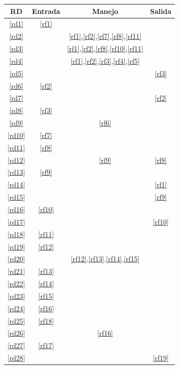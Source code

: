 \documentclass[12pt,a4paper]{article}
\begin{document}
\begin{table}[H]
\begin{center}
\begin{tabular}{|c|c|c|c|}
\hline
	RD & Entrada & Manejo & Salida\\
\hline
	\ref{rd1} & \ref{rf1} &  & \\
\hline
	\ref{rd2} &  & \ref{rf1},\ref{rf2},\ref{rf7},\ref{rf8},\ref{rf11} & \\
\hline
	\ref{rd3} &  & \ref{rf1},\ref{rf2},\ref{rf8},\ref{rf10},\ref{rf11} & \\
\hline
	\ref{rd4} &  & \ref{rf1},\ref{rf2},\ref{rf3},\ref{rf4},\ref{rf5} & \\
\hline
	\ref{rd5} &  &  & \ref{rf3} \\
\hline
	\ref{rd6} & \ref{rf2} &  & \\
\hline
	\ref{rd7} &  &  & \ref{rf2}\\
\hline
	\ref{rd8} & \ref{rf3} &  & \\
\hline
	\ref{rd9} &  & \ref{rf6} & \\
\hline
	\ref{rd10} & \ref{rf7} &  & \\
\hline
	\ref{rd11} & \ref{rf8} &  & \\
\hline
	\ref{rd12} &  & \ref{rf9} & \ref{rf8}\\
\hline
	\ref{rd13} & \ref{rf9} &  & \\
\hline
	\ref{rd14} &  &  & \ref{rf1}\\
\hline
	\ref{rd15} &  &  & \ref{rf9}\\
\hline
	\ref{rd16} & \ref{rf10} &  & \\
\hline
	\ref{rd17} &  &  & \ref{rf10} \\
\hline
	\ref{rd18} & \ref{rf11} &  & \\
\hline
	\ref{rd19} & \ref{rf12} &  & \\
\hline
	\ref{rd20} &  & \ref{rf12},\ref{rf13},\ref{rf14},\ref{rf15} & \\
\hline
	\ref{rd21} & \ref{rf13} &  & \\
\hline
	\ref{rd22} & \ref{rf14} &  & \\
\hline
	\ref{rd23} & \ref{rf15} &  & \\
\hline
	\ref{rd24} & \ref{rf16} &  & \\
\hline
	\ref{rd25} & \ref{rf18} & & \\
\hline
	\ref{rd26} &  & \ref{rf16} & \\
\hline
	\ref{rd27} & \ref{rf17} &  & \\
\hline
	\ref{rd28} &  &  & \ref{rf19}\\

\end{tabular}
\end{center}
\end{table}
\end{document}
